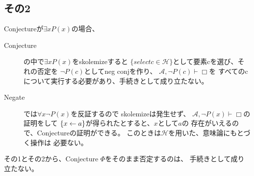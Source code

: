 \documentclass[10pt, oneside]{jarticle}   	%
\begin{document}
\subsection{その2}

Conjectureが$\exists x P(x)$の場合、
\begin{description}
\item[Conjecture] の中で$\exists x P(x)$をskolemizeすると
$\{ select c \in \mathcal{H}\}$として要素cを選び、それの否定を
$\neg P(c)$としてneg conjを作り、
$\mathcal{A}, \neg P(c) \vdash \Box$を
すべてのcについて実行する必要があり、手続きとして成り立たない。
\item[Negate]では$\forall x \neg P(x)$を反証するので
skolemizeは発生せず、
$\mathcal{A}, \neg P(x)\vdash \Box$の証明をして
$\{x \leftarrow a\}$が得られたとすると、$x$として$a$の
存在がいえるので、Conjectureの証明ができる。
このときは$\mathcal{H}$を用いた、意味論にもとづく操作は
必要ない。
\end{description}

その1とその2から、Conjecture $\Phi$をそのまま否定するのは、
手続きとして成り立たない。
\end{document}

